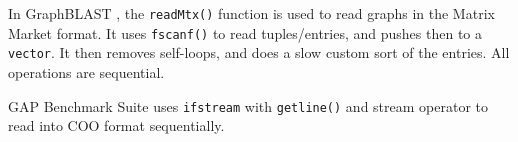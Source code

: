 In GraphBLAST \cite{yang2022graphblast}, the \texttt{readMtx()} function is used to read graphs in the Matrix Market format. It uses \texttt{fscanf()} to read tuples/entries, and pushes then to a \texttt{vector}. It then removes self-loops, and does a slow custom sort of the entries. All operations are sequential.

GAP Benchmark Suite \cite{beamer2015gap} uses \texttt{ifstream} with \texttt{getline()} and stream operator to read into COO format sequentially.


